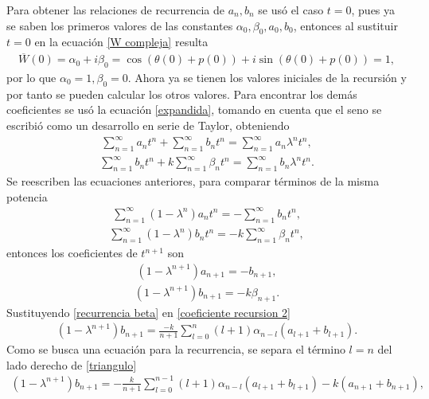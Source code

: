 Para obtener las relaciones de recurrencia de $a_{n},b_{n}$ se usó el caso $t=0$, pues ya se saben los primeros valores de las constantes $\alpha_{0}, \beta_{0}, a_{0}, b_{0}$, entonces al sustituir $t=0$ en la ecuación \eqref{W compleja} resulta
\begin{eqnarray}
\overline{W}(0)=\alpha_{0}+i\beta_{0}=\cos(\theta(0)+p(0))+i\sin(\theta(0)+p(0))=1,
\end{eqnarray}
por lo que $\alpha_{0}=1,\beta_{0}=0$. Ahora ya se tienen los valores iniciales de la recursión y por tanto se pueden calcular los otros valores. Para encontrar los demás coeficientes se usó la ecuación \eqref{expandida}, tomando en cuenta que el seno se escribió como un desarrollo en serie de Taylor, obteniendo
\begin{eqnarray}
\sum_{n=1}^{\infty}a_{n}t^{n}+\sum_{n=1}^{\infty}b_{n}t^{n}=\sum_{n=1}^{\infty}a_{n}\lambda^{n}t^{n},
\end{eqnarray}
\begin{eqnarray}
\sum_{n=1}^{\infty}b_{n}t^{n}+k\sum_{n=1}^{\infty}\beta_{n}t^{n}=\sum_{n=1}^{\infty}b_{n}
\lambda^{n}t^{n}.
\end{eqnarray}
Se reescriben las ecuaciones anteriores, para comparar términos de la misma potencia
\begin{eqnarray}
\sum_{n=1}^{\infty}(1-\lambda^{n})a_{n}t^{n}=-\sum_{n=1}^{\infty}b_{n}t^{n},
\end{eqnarray}
\begin{eqnarray}
\sum_{n=1}^{\infty}(1-\lambda^{n})b_{n}t^{n}=-k\sum_{n=1}^{\infty}\beta_{n}t^{n},
\end{eqnarray}
entonces los coeficientes de $t^{n+1}$ son
\begin{eqnarray}
(1-\lambda^{n+1})a_{n+1}=-b_{n+1},
\label{coeficiente recursion 1}
\end{eqnarray}
\begin{eqnarray}
(1-\lambda^{n+1})b_{n+1}=-k\beta_{n+1}.
\label{coeficiente recursion 2}
\end{eqnarray}
Sustituyendo \eqref{recurrencia beta} en  \eqref{coeficiente recursion 2}
\begin{eqnarray}
(1-\lambda^{n+1})b_{n+1}=\frac{-k}{n+1}\sum_{l=0}^{n}(l+1)\alpha_{n-l}(a_{l+1}+b_{l+1}).
\label{triangulo}
\end{eqnarray}
Como se busca una ecuación para la recurrencia, se separa el término $l=n$ del lado derecho de \eqref{triangulo}
\begin{eqnarray}
(1-\lambda^{n+1})b_{n+1}=-\frac{k}{n+1}\sum_{l=0}^{n-1}(l+1)\alpha_{n-l}(a_{l+1}+b_{l+1})-k(a_{n+1}+b_{n+1}),
\label{triangulo1}
\end{eqnarray}
